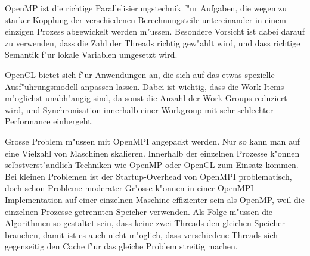 OpenMP ist die richtige Parallelisierungstechnik f"ur Aufgaben, die
wegen zu starker Kopplung der verschiedenen Berechnungsteile untereinander
in einem einzigen Prozess abgewickelt werden m"ussen.
Besondere Vorsicht ist dabei darauf zu verwenden, dass die Zahl der
Threads richtig gew"ahlt wird, und dass richtige Semantik f"ur
lokale Variablen umgesetzt wird.

OpenCL bietet sich f"ur Anwendungen an, die sich auf das etwas spezielle
Ausf"uhrungsmodell anpassen lassen. Dabei ist wichtig, dass die
Work-Items m"oglichst unabh"angig sind, da sonst die Anzahl der Work-Groups
reduziert wird, und Synchronisation innerhalb einer Workgroup mit
sehr schlechter Performance einhergeht.

Grosse Problem m"ussen mit OpenMPI angepackt werden. Nur so kann man
auf eine Vielzahl von Maschinen skalieren. Innerhalb der einzelnen
Prozesse k"onnen selbstverst"andlich Techniken wie OpenMP oder OpenCL 
zum Einsatz kommen.
Bei kleinen Problemen ist der Startup-Overhead von OpenMPI problematisch,
doch schon Probleme moderater Gr"osse k"onnen in einer OpenMPI Implementation
auf einer einzelnen Maschine effizienter sein als OpenMP, weil die
einzelnen Prozesse getrennten Speicher verwenden. Als Folge m"ussen die
Algorithmen so gestaltet sein, dass keine zwei Threads den gleichen
Speicher brauchen, damit ist es auch nicht m"oglich, dass verschiedene
Threads sich gegenseitig den Cache f"ur das gleiche Problem streitig machen.


